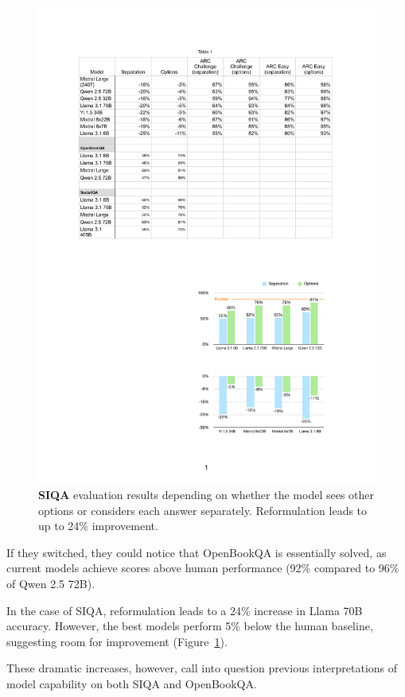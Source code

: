 \documentclass[11pt]{article}
\begin{document}
\begin{figure}[t]
    \centering
    \includegraphics[width=\linewidth]{images/siqa.pdf}
    \caption{{\color{snoworange}\textbf{SIQA}} evaluation results depending on whether the model sees other options or considers each answer separately. Reformulation leads to up to 24\% improvement.}
    \label{fig:siqa}
\end{figure}

If they switched, they could notice that OpenBookQA is essentially solved, as current models achieve scores above human performance (92\% compared to 96\% of Qwen 2.5 72B).

In the case of SIQA, reformulation leads to a 24\% increase in Llama 70B accuracy. However, the best models perform 5\% below the human baseline, suggesting room for improvement (Figure~\ref{fig:siqa}).

These dramatic increases, however, call into question previous interpretations of model capability on both SIQA and OpenBookQA.
\end{document}
